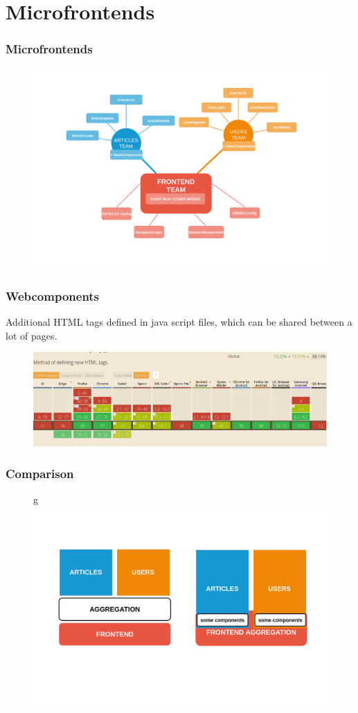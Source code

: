 \section{Microfrontends}

\begin{frame}
\frametitle{Microfrontends}
	\begin{figure}
		\centering
		\includegraphics[width=0.9\linewidth]{pictures/microfrontends-knowledge.png}		
		\label{fig:microservices}
	\end{figure}
\end{frame}

\begin{frame}
\frametitle{Webcomponents}
Additional HTML tags defined in java script files, which can be shared between a lot of pages.
\begin{figure}
	\centering
	\includegraphics[width=1\linewidth]{pictures/webcomponents-support.png}		
	\label{fig:microservices}
\end{figure}
\end{frame}

\begin{frame}
\frametitle{Comparison}
\begin{figure}
	\centerin g
	\includegraphics[width=0.9\linewidth]{pictures/microfrontends-vs-microservices.png}		
	\label{fig:vs}
\end{figure}
\end{frame}